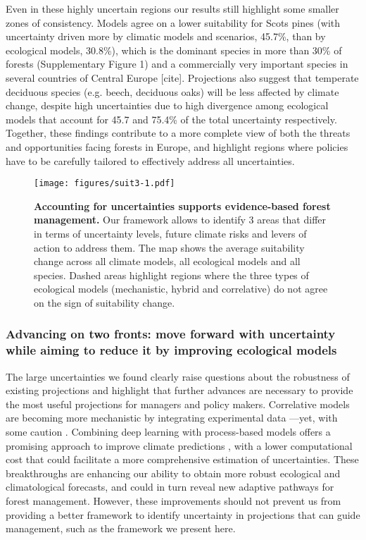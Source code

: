 \documentclass[11pt,letter]{article}
\begin{document}
Even in these highly uncertain regions our results still highlight some smaller zones of consistency. Models agree on a lower suitability for Scots pines (with uncertainty driven more by climatic models and scenarios, 45.7\%, than by ecological models, 30.8\%), which is the dominant species in more than 30\% of forests (Supplementary Figure 1) and a commercially very important species in several countries of Central Europe [cite]. %
Projections also suggest that temperate deciduous species (e.g. beech, deciduous oaks) will be less affected by climate change, despite high uncertainties due to high divergence among ecological models that account for 45.7 and 75.4\% of the total uncertainty respectively. Together, these findings contribute to a more complete view of both the threats and opportunities facing forests in Europe, and highlight regions where policies have to be carefully tailored to effectively address all uncertainties.



\begin{figure}
	\centering
	\texttt{[image: figures/suit3-1.pdf]}
	\caption{\textbf{Accounting for uncertainties supports evidence-based forest management.} Our framework allows to identify 3 areas that differ in terms of uncertainty levels, future climate risks and levers of action to address them. The map shows the average suitability change across all climate models, all ecological models and all species. Dashed areas highlight regions where the three types of ecological models (mechanistic, hybrid and correlative) do not agree on the sign of suitability change.}
	\label{fig:manag}
\end{figure}

\subsubsection*{Advancing on two fronts: move forward with uncertainty while aiming to reduce it by improving ecological models}

The large uncertainties we found clearly raise questions about the robustness of existing projections and highlight that further advances are necessary to provide the most useful projections for managers and policy makers. 
Correlative models are becoming more mechanistic by integrating experimental data \citep{Wagner2023}---yet, with some caution \citep{Chevalier2024a}. Combining deep learning with process-based models offers a promising approach to improve climate predictions \citep{Kochkov2024}, with a lower computational cost that could facilitate a more comprehensive estimation of uncertainties. These breakthroughs are enhancing our ability to obtain more robust ecological and climatological forecasts, and could in turn reveal new adaptive pathways for forest management. However, these improvements should not prevent us from providing a better framework to identify uncertainty in projections that can guide management, such as the framework we present here.  
\end{document}
